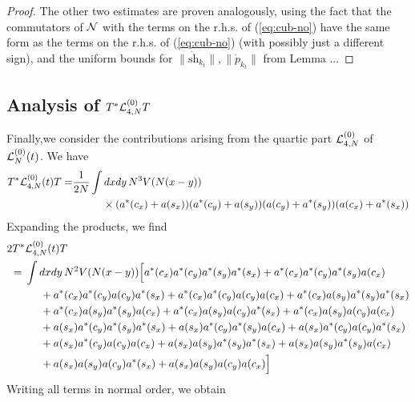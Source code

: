 \documentclass[11pt,a4paper,DIV11]{scrartcl}	%
\newcommand{\cL}{{\cal L}}
\newcommand{\cN}{{\cal N}}
\begin{document}
\begin{proof}
The other two estimates are proven analogously, using the fact that the commutators of $\cN$ with the terms on the r.h.s. of (\ref{eq:cub-no}) have the same form as the terms on the r.h.s. of (\ref{eq:cub-no}) (with possibly just a different sign), and the uniform bounds for $\| \dot{\text{sh}}_{k_t} \|, \| \dot{p}_{k_t} \|$ from Lemma ...
\end{proof}

\subsection{Analysis of $T^* \cL^{(0)}_{4,N} T$}

Finally,we consider the contributions arising from the quartic part $\cL_{4,N}^{(0)}$ of $\cL_N^{(0)} (t)$. We have
\[\begin{split} T^* \cL_{4,N}^{(0)} (t) T = &\frac{1}{2N} \int dx dy \, N^3 V(N (x-y)) \\ &\hspace{1cm} \times (a^* (c_x) + a (s_x)) (a^* (c_y) + a (s_y)) (a (c_y) + a^* (s_y)) (a(c_x) + a^* (s_x)) \end{split} \] 
Expanding the products, we find 
\[ \begin{split} 
2 T^* & \cL_{4,N}^{(0)} (t) T \\ =  \; & \int dx dy \, N^2 V (N (x-y)) \Big[ a^* (c_x) a^* (c_y) a^* (s_y) a^* (s_x) + a^* (c_x) a^* (c_y) a^* (s_y) a (c_x) \\ &\hspace{.5cm} + a^* (c_x) a^* (c_y) a(c_y) a^* (s_x) + a^* (c_x) a^* (c_y) a (c_y) a (c_x)  + a^* (c_x) a (s_y) a^* (s_y) a^* (s_x)  \\ &\hspace{.5cm}  + a^* (c_x) a (s_y) a^* (s_y) a (c_x) + a^* (c_x) a (s_y) a(c_y) a^* (s_x) + a^* (c_x) a (s_y) a (c_y) a (c_x)  \\ &\hspace{.5cm}  + a (s_x) a^* (c_y) a^* (s_y) a^* (s_x) + a (s_x) a^* (c_y) a^* (s_y) a (c_x) + a (s_x) a^* (c_y) a(c_y) a^* (s_x)  \\ &\hspace{.5cm} + a (s_x) a^* (c_y) a (c_y) a (c_x)  + a (s_x) a (s_y) a^* (s_y) a^* (s_x) + a (s_x) a (s_y) a^* (s_y) a (c_x)  \\ &\hspace{.5cm}  + a (s_x) a (s_y) a(c_y) a^* (s_x) + a (s_x) a (s_y) a (c_y) a (c_x) \Big] 
\end{split} \]
Writing all terms in normal order, we obtain
\end{document}
